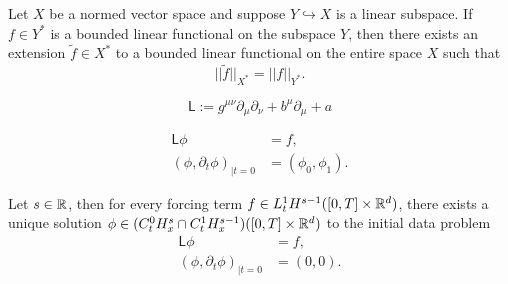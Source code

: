 \begin{lemma}
    Let $X$ be a normed vector space and suppose $Y \hookrightarrow X$ is a linear subspace. If $f \in Y^*$ is a bounded linear functional on the subspace $Y$, then there exists an extension $\widetilde{f} \in X^*$ to a bounded linear functional on the entire space $X$ such that 
        \[
            ||\widetilde f||_{X^*} = ||f||_{Y^*}. 
        \]
\end{lemma}




    \[
        \mathsf L := g^{\mu \nu} \partial_\mu \partial_\nu + b^\mu \partial_\mu + a
    \]

\begin{equation}\label{eq:varlinear}\tag{VW}
    \begin{split}
        \mathsf L \phi 
        &= f, \\
    (\phi, \partial_t \phi)_{|t = 0} 
        &= (\phi_0, \phi_1). 
    \end{split}
\end{equation}


\begin{theorem}
    Let $s \in \mathbb R$, then for every forcing term $f \in L^1_t H^{s - 1} ([0, T] \times \mathbb R^d)$, there exists a unique solution $\phi \in (C^0_t H^s_x \cap C^1_t H^{s - 1}_x) ([0, T] \times \mathbb R^d)$ to the initial data problem 
        \begin{align*}
            \mathsf L \phi 
                &= f, \\
            (\phi, \partial_t \phi)_{|t = 0}
                &= (0, 0). 
        \end{align*}
\end{theorem}